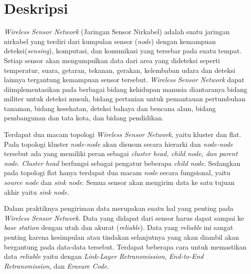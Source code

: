 \documentclass[a4paper,twoside]{article}
\begin{document}
\title{\@judultopik}
\author{\nama \textendash \@npm} 

\newcommand{\nama}{Jonathan Alva}
\newcommand{\@npm}{2015730047}
\newcommand{\@judultopik}{Pengembangan Aplikasi Transfer Data di WSN} %
\newcommand{\jumpemb}{1} %
\newcommand{\tanggal}{05/09/2018}


\maketitle


\section{Deskripsi}
{\it Wireless Sensor Network} (Jaringan Sensor Nirkabel) adalah suatu jaringan nirkabel yang terdiri dari kumpulan sensor ({\it node}) dengan kemampuan deteksi({\it sensing}), komputasi, dan komunikasi yang tersebar pada suatu tempat. Setiap sensor akan mengumpulkan data dari area yang dideteksi seperti temperatur, suara, getaran, tekanan, gerakan, kelembaban udara dan deteksi lainnya tergantung kemampuan sensor tersebut. {\it Wireless Sensor Network} dapat diimplementasikan pada berbagai bidang kehidupan manusia diantaranya bidang militer untuk deteksi musuh, bidang pertanian untuk pemantauan pertumbuhan tanaman, bidang kesehatan, deteksi bahaya dan bencana alam, bidang pembangunan dan tata kota, dan bidang pendidikan.  

Terdapat dua macam topologi {\it Wireless Sensor Network}, yaitu kluster dan flat. Pada topologi kluster {\it node-node} akan disusun secara hierarki dan {\it node-node} tersebut ada yang memiliki peran sebagai {\it cluster head, child node, dan parent node}. {\it Cluster head} berfungsi sebagai pengatur beberapa {\it child node}. Sedangkan pada topologi flat hanya terdapat dua macam {\it node} secara fungsional, yaitu {\it source node} dan {\it sink node}. Semua sensor akan mengirim data ke satu tujuan akhir yaitu {\it sink node}. 

Dalam praktiknya pengiriman data merupakan suatu hal yang penting pada {\it Wireless Sensor Network}. Data yang didapat dari sensor harus dapat sampai ke {\it base station} dengan utuh dan akurat ({\it reliable}). Data yang {\it reliable} ini sangat penting karena kesimpulan atau tindakan selanjutnya yang akan diambil akan bergantung pada data-data tersebut. Terdapat beberapa cara untuk memastikan data {\it reliable} yaitu dengan {\it Link-Layer Retransmission}, {\it End-to-End Retransmission}, dan {\it Erasure Code}.
\end{document}
